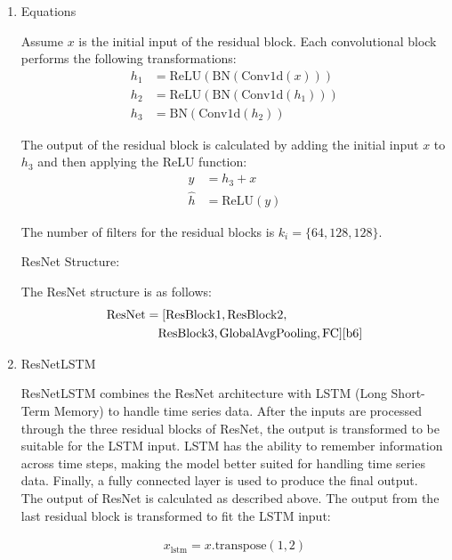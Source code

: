 \documentclass[conference]{IEEEtran}
\begin{document}
\begin{enumerate}
  \item Equations
  
  Assume $x$ is the initial input of the residual block. Each convolutional block performs the following transformations:
  \begin{align*}
    h_1 &= \text{ReLU}(\text{BN}(\text{Conv1d}(x))) \\
    h_2 &= \text{ReLU}(\text{BN}(\text{Conv1d}(h_1))) \\
    h_3 &= \text{BN}(\text{Conv1d}(h_2))
  \end{align*}

  The output of the residual block is calculated by adding the initial input $x$ to $h_3$ and then applying the ReLU function:
  \begin{align*}
    y &= h_3 + x \\
    \hat{h} &= \text{ReLU}(y)
  \end{align*}

  The number of filters for the residual blocks is $k_i = \{64, 128, 128\}$.

  \vspace{0.5cm}  %

  ResNet Structure:

  The ResNet structure is as follows: \\
  \begin{align*}
    \text{ResNet} &= [\text{ResBlock1}, \text{ResBlock2}, \\
                    &\quad \text{ResBlock3}, \text{GlobalAvgPooling}, \text{FC}] \cite{b6}
  \end{align*}
    
  \item ResNetLSTM
  
    ResNetLSTM combines the ResNet architecture with LSTM (Long Short-Term Memory) to handle time series data. After the inputs are processed through the three residual blocks of ResNet, the output is transformed to be suitable for the LSTM input. LSTM has the ability to remember information across time steps, making the model better suited for handling time series data. Finally, a fully connected layer is used to produce the final output. \cite{b7} \\ 
    The output of ResNet is calculated as described above. The output from the last residual block is transformed to fit the LSTM input:

    \begin{align*}
        x_{\text{lstm}} = x.\text{transpose}(1, 2)
    \end{align*}
    

\end{enumerate}
\end{document}
